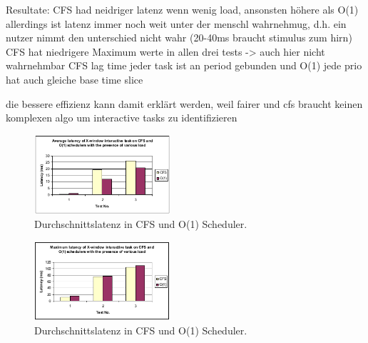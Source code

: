 Resultate:
CFS had neidriger latenz wenn wenig load, ansonsten höhere als O(1)
	allerdings ist latenz immer noch weit unter der menschl wahrnehmug, d.h. ein nutzer nimmt den unterschied nicht wahr (20-40ms braucht stimulus zum hirn)
CFS hat niedrigere Maximum werte in allen drei tests -> auch hier nicht wahrnehmbar
CFS lag time jeder task ist an period gebunden und O(1) jede prio hat auch gleiche base time slice

die bessere effizienz kann damit erklärt werden, weil fairer und cfs braucht keinen komplexen algo um interactive tasks zu identifizieren
\begin{figure}[h]
 	\centering
 	\includegraphics[width=0.45\textwidth]{pictures/avg_latency.png}
 	\caption{Durchschnittslatenz in CFS und O(1) Scheduler.}
 	\label{fig:avg_latency}
\end{figure}

\begin{figure}[h]
 	\centering
 	\includegraphics[width=0.45\textwidth]{pictures/max_latency.png}
 	\caption{Durchschnittslatenz in CFS und O(1) Scheduler.}
 	\label{fig:max_latency}
\end{figure}